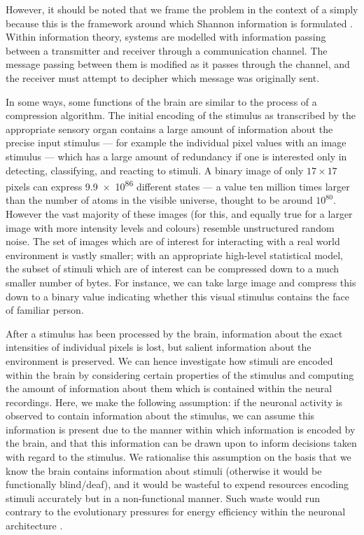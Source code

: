 However, it should be noted that we frame the problem in the context of a  simply because this is the framework around which Shannon information is formulated \citep[Chapter~2]{mackay2003information}.
Within information theory, systems are modelled with information passing between a transmitter and receiver through a communication channel.
The message passing between them is modified as it passes through the channel, and the receiver must attempt to decipher which message was originally sent.

In some ways, some functions of the brain are similar to the process of a compression algorithm.
The initial encoding of the stimulus as transcribed by the appropriate sensory organ contains a large amount of information about the precise input stimulus --- for example the individual pixel values with an image stimulus --- which has a large amount of redundancy if one is interested only in detecting, classifying, and reacting to stimuli.
A binary image of only $17 \times 17$ pixels can express \num{9.9e86} different states --- a value ten million times larger than the number of atoms in the visible universe, thought to be around $10^{80}$.
However the vast majority of these images (for this, and equally true for a larger image with more intensity levels and colours) resemble unstructured random noise.
The set of images which are of interest for interacting with a real world environment is vastly smaller; with an appropriate high-level statistical model, the subset of stimuli which are of interest can be compressed down to a much smaller number of bytes.
For instance, we can take large image and compress this down to a binary value indicating whether this visual stimulus contains the face of familiar person.

After a stimulus has been processed by the brain, information about the exact intensities of individual pixels is lost, but salient information about the environment is preserved.
We can hence investigate how stimuli are encoded within the brain by considering certain properties of the stimulus and computing the amount of information about them which is contained within the neural recordings.
Here, we make the following assumption: if the neuronal activity is observed to contain information about the stimulus, we can assume this information is present due to the manner within which information is encoded by the brain, and that this information can be drawn upon to inform decisions taken with regard to the stimulus.
We rationalise this assumption on the basis that we know the brain contains information about stimuli (otherwise it would be functionally blind/deaf), and it would be wasteful to expend resources encoding stimuli accurately but in a non-functional manner.
Such waste would run contrary to the evolutionary pressures for energy efficiency within the neuronal architecture \citep{Laughlin2001,Niven2008}.

